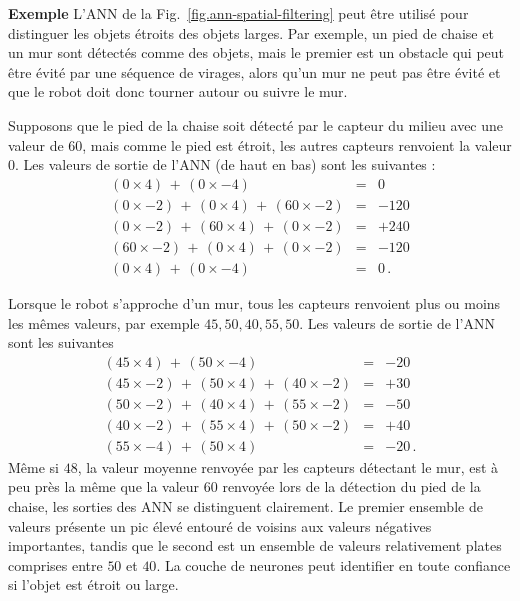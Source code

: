 \medskip

\noindent\textbf{Exemple} L'ANN de la Fig.~\ref{fig.ann-spatial-filtering} peut être utilisé pour distinguer les objets étroits des objets larges. Par exemple, un pied de chaise et un mur sont détectés comme des objets, mais le premier est un obstacle qui peut être évité par une séquence de virages, alors qu'un mur ne peut pas être évité et que le robot doit donc tourner autour ou suivre le mur.

Supposons que le pied de la chaise soit détecté par le capteur du milieu avec une valeur de $60$, mais comme le pied est étroit, les autres capteurs renvoient la valeur $0$. Les valeurs de sortie de l'ANN (de haut en bas) sont les suivantes :
\begin{eqnarray*}
(0\times 4) \,+ \, (0\times -4) &=& 0\\
(0\times -2) \,+ \, (0\times 4) \,+ \, (60\times -2)&=&-120\\
(0\times -2) \,+ \, (60\times 4) \,+ \,  (0\times -2)&=&+240\\
(60\times -2) \,+ \, (0\times 4) \,+ \, (0\times -2)&=&-120\\
(0\times 4) \,+ \, (0\times -4) &=&0\,.
\end{eqnarray*}

Lorsque le robot s'approche d'un mur, tous les capteurs renvoient plus ou moins les mêmes valeurs, par exemple $45, 50, 40, 55, 50$. Les valeurs de sortie de l'ANN sont les suivantes
\begin{eqnarray*}
(45\times 4)  \,+ \, (50\times -4)&=&-20\\
(45\times -2) \,+ \, (50\times 4) \,+ \, (40\times -2)&=&+30\\
(50\times -2) \,+ \, (40\times 4) \,+ \, (55\times -2)&=&-50\\
(40\times -2) \,+ \, (55\times 4) \,+ \, (50\times -2)&=&+40\\
(55\times -4) \,+ \, (50\times 4)&=&-20\,.
\end{eqnarray*}
Même si $48$, la valeur moyenne renvoyée par les capteurs détectant le mur, est à peu près la même que la valeur $60$ renvoyée lors de la détection du pied de la chaise, les sorties des ANN se distinguent clairement. Le premier ensemble de valeurs présente un pic élevé entouré de voisins aux valeurs négatives importantes, tandis que le second est un ensemble de valeurs relativement plates comprises entre $50$ et $40$. La couche de neurones peut identifier en toute confiance si l'objet est étroit ou large.

